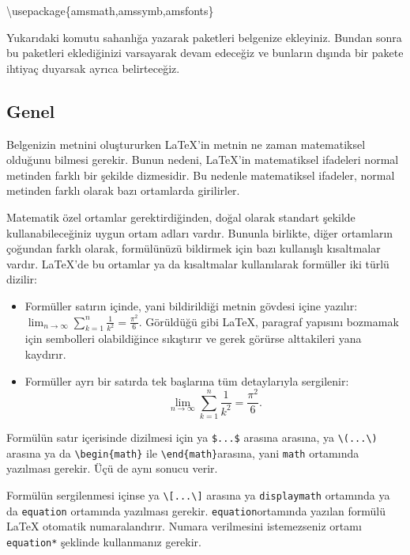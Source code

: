 \documentclass[
  10pt,
]{scrbook}
\newenvironment{Shaded}{\begin{snugshade}}{\end{snugshade}}
\newcommand{\BuiltInTok}[1]{#1}
\newcommand{\ExtensionTok}[1]{#1}
\newcommand{\NormalTok}[1]{#1}
\providecommand{\tightlist}{%
  \setlength{\itemsep}{0pt}\setlength{\parskip}{0pt}}
\theoremstyle{definition}
\theoremstyle{definition}
\theoremstyle{definition}
\theoremstyle{definition}
\theoremstyle{remark}
\begin{document}
\begin{Shaded}
\begin{Highlighting}[]
\BuiltInTok{\textbackslash{}usepackage}\NormalTok{\{}\ExtensionTok{amsmath,amssymb,amsfonts}\NormalTok{\}}
\end{Highlighting}
\end{Shaded}

Yukarıdaki komutu sahanlığa yazarak paketleri belgenize ekleyiniz. Bundan sonra bu paketleri eklediğinizi varsayarak devam edeceğiz ve bunların dışında bir pakete ihtiyaç duyarsak ayrıca belirteceğiz.

\hypertarget{genel-1}{%
\subsection{Genel}\label{genel-1}}

Belgenizin metnini oluştururken LaTeX'in metnin ne zaman matematiksel olduğunu bilmesi gerekir. Bunun nedeni, LaTeX'in matematiksel ifadeleri normal metinden farklı bir şekilde dizmesidir. Bu nedenle matematiksel ifadeler, normal metinden farklı olarak bazı ortamlarda girilirler.

Matematik özel ortamlar gerektirdiğinden, doğal olarak standart şekilde kullanabileceğiniz uygun ortam adları vardır. Bununla birlikte, diğer ortamların çoğundan farklı olarak, formülünüzü bildirmek için bazı kullanışlı kısaltmalar vardır. LaTeX'de bu ortamlar ya da kısaltmalar kullanılarak formüller iki türlü dizilir:

\begin{itemize}
\tightlist
\item
  Formüller satırın içinde, yani bildirildiği metnin gövdesi içine yazılır: \(\lim_{n \to \infty} \sum_{k=1}^n \frac{1}{k^2} =\frac{\pi^2}{6}\). Görüldüğü gibi LaTeX, paragraf yapısını bozmamak için sembolleri olabildiğince sıkıştırır ve gerek görürse alttakileri yana kaydırır.
\item
  Formüller ayrı bir satırda tek başlarına tüm detaylarıyla sergilenir: \[\lim_{n \to \infty} \sum_{k=1}^n
  \frac{1}{k^2} =\frac{\pi^2}{6}.\]
\end{itemize}

Formülün satır içerisinde dizilmesi için ya \texttt{\$...\$} arasına arasına, ya \texttt{\textbackslash{}(...\textbackslash{})} arasına ya da \texttt{\textbackslash{}begin\{math\}} ile \texttt{\textbackslash{}end\{math\}}arasına, yani \texttt{math} ortamında yazılması gerekir. Üçü de aynı sonucu verir.

Formülün sergilenmesi içinse ya \texttt{\textbackslash{}{[}...\textbackslash{}{]}} arasına ya \texttt{displaymath} ortamında ya da \texttt{equation} ortamında yazılması gerekir. \texttt{equation}ortamında yazılan formülü LaTeX otomatik numaralandırır. Numara verilmesini istemezseniz ortamı \texttt{equation*} şeklinde kullanmanız gerekir.
\end{document}
